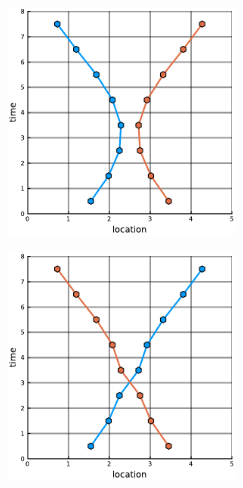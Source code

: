 \documentclass[12pt]{article}
\theoremstyle{definition}
\begin{document}
\begin{figure}
    \centering
    \begin{subfigure}[t]{0.45\textwidth}
      \includegraphics[width=6cm]{jumps-1a.pdf}
      \caption{}
      \label{fig:jumps-1a}
    \end{subfigure}
    \begin{subfigure}[t]{0.45\textwidth}
      \includegraphics[width=6cm]{jumps-1b.pdf}
      \caption{}
      \label{fig:jumps-1b}
    \end{subfigure}


\end{figure}
\end{document}
